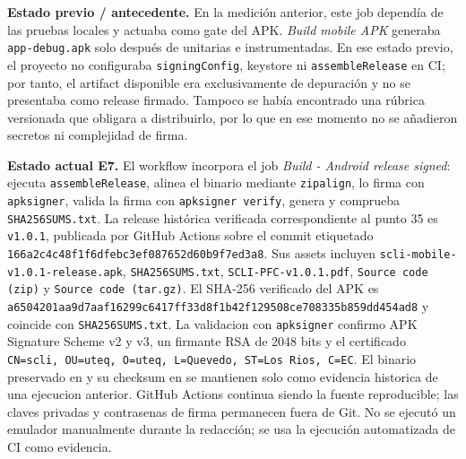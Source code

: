 \textbf{Estado previo / antecedente.} En la medición anterior, este job dependía
de las pruebas locales y actuaba como gate del APK. \emph{Build mobile APK}
generaba \texttt{app-debug.apk} solo después de unitarias e instrumentadas. En
ese estado previo, el proyecto no configuraba \texttt{signingConfig}, keystore
ni \texttt{assembleRelease} en CI; por tanto, el artifact disponible era
exclusivamente de depuración y no se presentaba como release firmado. Tampoco se
había encontrado una rúbrica versionada que obligara a distribuirlo, por lo que
en ese momento no se añadieron secretos ni complejidad de firma.

\textbf{Estado actual E7.} El workflow incorpora el job \emph{Build - Android
release signed}: ejecuta \texttt{assembleRelease}, alinea el binario mediante
\texttt{zipalign}, lo firma con \texttt{apksigner}, valida la firma con
\texttt{apksigner verify}, genera y comprueba \texttt{SHA256SUMS.txt}. La
release histórica verificada correspondiente al punto 35 es \texttt{v1.0.1},
publicada por GitHub Actions sobre el commit etiquetado
\texttt{166a2c4c48f1f6dfebc3ef087652d60b9f7ed3a8}. Sus assets incluyen
\texttt{scli-mobile-v1.0.1-release.apk}, \texttt{SHA256SUMS.txt},
\texttt{SCLI-PFC-v1.0.1.pdf}, \texttt{Source code (zip)} y
\texttt{Source code (tar.gz)}. El SHA-256 verificado del APK es
\texttt{a6504201aa9d7aaf16299c6417ff33d8f1b42f129508ce708335b859dd454ad8} y
coincide con \texttt{SHA256SUMS.txt}. La validacion con \texttt{apksigner}
confirmo APK Signature Scheme v2 y v3, un firmante RSA de 2048 bits y el
certificado \texttt{CN=scli, OU=uteq, O=uteq, L=Quevedo, ST=Los Rios, C=EC}.
El binario preservado en  y su
checksum en  se mantienen solo como evidencia
historica de una ejecucion anterior. GitHub Actions continua siendo la fuente reproducible; las
claves privadas y contrasenas de firma permanecen fuera de Git.
No se ejecutó un emulador manualmente durante la redacción; se usa la ejecución
automatizada de CI como evidencia.

